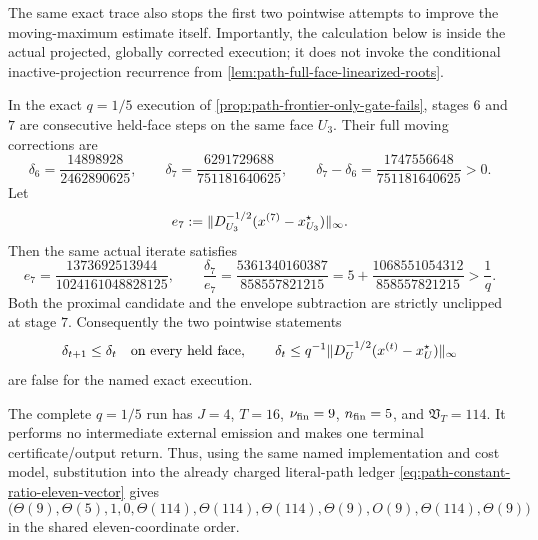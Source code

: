 The same exact trace also stops the first two pointwise attempts to improve
the moving-maximum estimate itself.  Importantly, the calculation below is
inside the actual projected, globally corrected execution; it does not invoke
the conditional inactive-projection recurrence from
\cref{lem:path-full-face-linearized-roots}.

\begin{proposition}
\label{prop:path-monotone-correction-potential-fails}
In the exact $q=1/5$ execution of
\cref{prop:path-frontier-only-gate-fails}, stages $6$ and $7$ are consecutive
held-face steps on the same face $U_3$.  Their full moving corrections are
\begin{equation}
 \delta_6=\frac{14898928}{2462890625},
 \qquad
 \delta_7=\frac{6291729688}{751181640625},
 \qquad
 \delta_7-\delta_6
 =\frac{1747556648}{751181640625}>0.
 \label{eq:path-stage-seven-correction-growth}
\end{equation}
Let
\begin{equation*}
 e_7:=\lVert D_{U_3}^{-1/2}
                   (x^{(7)}-x_{U_3}^{\star})\rVert_\infty .
\end{equation*}
Then the same actual iterate satisfies
\begin{equation}
 e_7=\frac{1373692513944}{1024161048828125},
 \qquad
 \frac{\delta_7}{e_7}
 =\frac{5361340160387}{858557821215}
 =5+\frac{1068551054312}{858557821215}
 >\frac1q.
 \label{eq:path-stage-seven-correction-error-stop}
\end{equation}
Both the proximal candidate and the envelope subtraction are strictly
unclipped at stage $7$.  Consequently the two pointwise statements
\begin{equation*}
 \delta_{t+1}\leq\delta_t
 \quad\hbox{on every held face},
 \qquad
 \delta_t\leq q^{-1}
 \lVert D_{U}^{-1/2}(x^{(t)}-x_U^\star)\rVert_\infty
\end{equation*}
are false for the named exact execution.

The complete $q=1/5$ run has
$J=4$, $T=16$, $\nu_{\rm fin}=9$,
$n_{\rm fin}=5$, and $\mathfrak V_T=114$.  It performs no intermediate
external emission and makes one terminal certificate/output return.  Thus,
using the same named implementation and cost model, substitution into the
already charged literal-path ledger
\cref{eq:path-constant-ratio-eleven-vector} gives
\begin{equation}
 \bigl(\Theta(9),\Theta(5),1,0,
       \Theta(114),\Theta(114),\Theta(114),
       \Theta(9),O(9),\Theta(114),\Theta(9)\bigr)
 \label{eq:path-monotone-correction-stop-eleven-vector}
\end{equation}
in the shared eleven-coordinate order.
\end{proposition}

